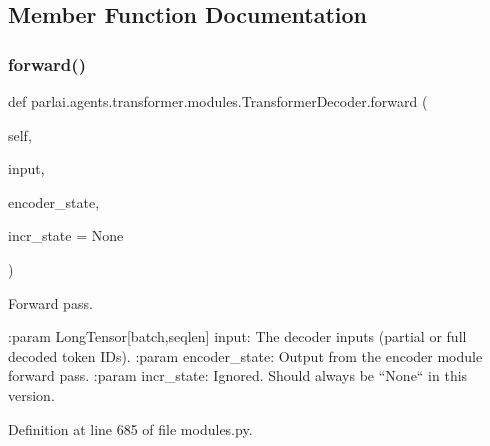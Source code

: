 \subsection{Member Function Documentation}
\mbox{\label{classparlai_1_1agents_1_1transformer_1_1modules_1_1TransformerDecoder_a19b2e9eecef1384bcfa9f772cac24a20}} 
\subsubsection{\texorpdfstring{forward()}{forward()}}
{\footnotesize\ttfamily def parlai.\+agents.\+transformer.\+modules.\+Transformer\+Decoder.\+forward (\begin{DoxyParamCaption}\item[{}]{self,  }\item[{}]{input,  }\item[{}]{encoder\+\_\+state,  }\item[{}]{incr\+\_\+state = {\ttfamily None} }\end{DoxyParamCaption})}

\begin{DoxyVerb}Forward pass.

:param LongTensor[batch,seqlen] input:
    The decoder inputs (partial or full decoded token IDs).
:param encoder_state:
    Output from the encoder module forward pass.
:param incr_state:
    Ignored. Should always be ``None`` in this version.
\end{DoxyVerb}
 

Definition at line 685 of file modules.\+py.


